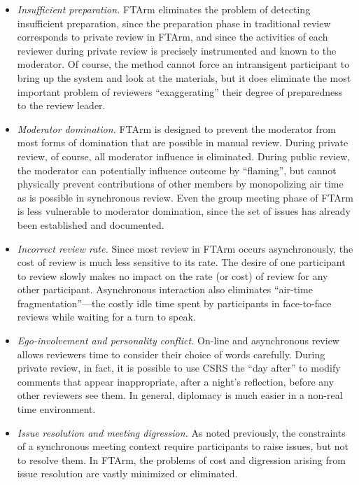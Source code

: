 \begin{itemize}
  
\item {\em Insufficient preparation.} FTArm eliminates the problem of
  detecting insufficient preparation, since the preparation phase in
  traditional review corresponds to private review in FTArm, and since the
  activities of each reviewer during private review is precisely
  instrumented and known to the moderator.  Of course, the method cannot
  force an intransigent participant to bring up the system and look at the
  materials, but it does eliminate the most important problem of reviewers
  ``exaggerating'' their degree of preparedness to the review leader. 
  
\item {\em Moderator domination.} FTArm is designed to prevent the
  moderator from most forms of domination that are possible in manual review.
  During private review, of course, all moderator influence is eliminated.
  During public review, the moderator can potentially influence outcome by
  ``flaming'', but cannot physically prevent contributions of other members
  by monopolizing air time as is possible in synchronous review.  Even the
  group meeting phase of FTArm is less vulnerable to moderator domination,
  since the set of issues has already been established and documented.
  
\item {\em Incorrect review rate.} Since most review in FTArm occurs
  asynchronously, the cost of review is much less sensitive to its rate.
  The desire of one participant to review slowly makes no impact on the
  rate (or cost) of review for any other participant.  Asynchronous
  interaction also eliminates ``air-time fragmentation''---the costly idle
  time spent by participants in face-to-face reviews while waiting
  for a turn to speak.
  
\item {\em Ego-involvement and personality conflict.} On-line and
  asynchronous review allows reviewers time to consider their choice of
  words carefully.  During private review, in fact, it is possible to use
  CSRS the ``day after'' to modify comments that appear inappropriate,
  after a night's reflection, before any other reviewers see them.  In
  general, diplomacy is much easier in a non-real time environment.
  
\item {\em Issue resolution and meeting digression.} As noted previously,
  the constraints of a synchronous meeting context require participants to
  raise issues, but not to resolve them.  In FTArm, the problems of cost and
  digression arising from issue resolution are vastly minimized or
  eliminated.  
  

\end{itemize}
